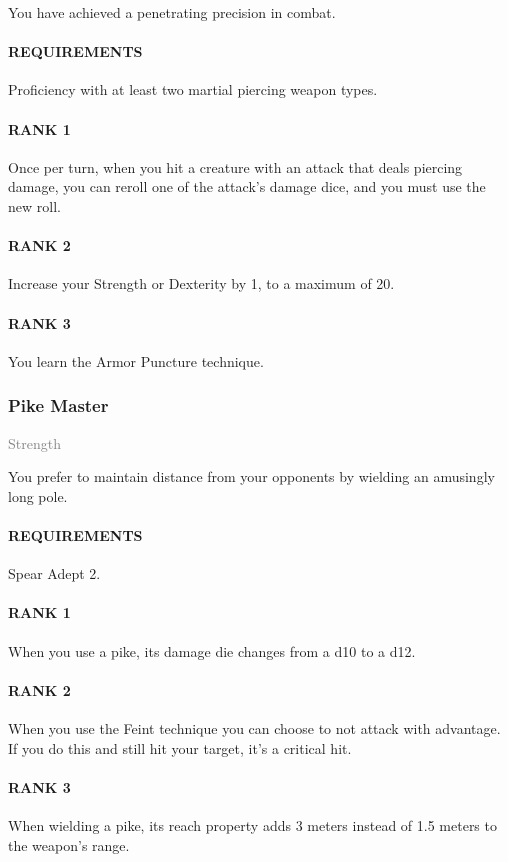 \normalsize
You have achieved a penetrating precision in combat.
\paragraph{REQUIREMENTS} Proficiency with at least two martial piercing weapon types.
\paragraph{RANK 1} Once per turn, when you hit a creature with an attack that deals piercing damage, you can reroll one of the attack's damage dice, and you must use the new roll.
\paragraph{RANK 2} Increase your Strength or Dexterity by 1, to a maximum of 20.
\paragraph{RANK 3} You learn the Armor Puncture technique.

\subsubsection{Pike Master} \label{feat::pikemaster}
\small{\textcolor{gray}{Strength}}

\normalsize
You prefer to maintain distance from your opponents by wielding an amusingly long pole.
\paragraph{REQUIREMENTS} Spear Adept 2.
\paragraph{RANK 1} When you use a pike, its damage die changes from a d10 to a d12.
\paragraph{RANK 2} When you use the Feint technique you can choose to not attack with advantage.
If you do this and still hit your target, it's a critical hit.
\paragraph{RANK 3} When wielding a pike, its reach property adds 3 meters instead of 1.5 meters to the weapon's range.


